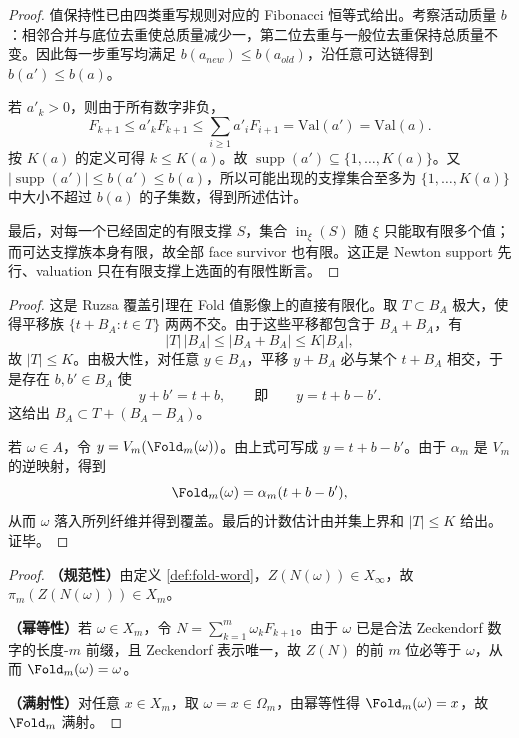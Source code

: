 \begin{proof}
值保持性已由四类重写规则对应的 Fibonacci 恒等式给出。考察活动质量 \(b\)：相邻合并与底位去重使总质量减少一，第二位去重与一般位去重保持总质量不变。因此每一步重写均满足 \(b(a_{new})\le b(a_{old})\)，沿任意可达链得到 \(b(a')\le b(a)\)。

若 \(a'_k>0\)，则由于所有数字非负，
\[
F_{k+1}\le a'_kF_{k+1}\le \sum_{i\ge1}a'_iF_{i+1}=\mathrm{Val}(a')=\mathrm{Val}(a).
\]
按 \(K(a)\) 的定义可得 \(k\le K(a)\)。故 \(\operatorname{supp}(a')\subseteq\{1,\ldots,K(a)\}\)。又 \(|\operatorname{supp}(a')|\le b(a')\le b(a)\)，所以可能出现的支撑集合至多为 \(\{1,\ldots,K(a)\}\) 中大小不超过 \(b(a)\) 的子集数，得到所述估计。

最后，对每一个已经固定的有限支撑 \(S\)，集合 \(\operatorname{in}_\xi(S)\) 随 \(\xi\) 只能取有限多个值；而可达支撑族本身有限，故全部 face survivor 也有限。这正是 Newton support 先行、valuation 只在有限支撑上选面的有限性断言。
\end{proof}

\begin{proof}
这是 Ruzsa 覆盖引理在 Fold 值影像上的直接有限化。取 \(T\subset B_A\) 极大，使得平移族 \(\{t+B_A:t\in T\}\) 两两不交。由于这些平移都包含于 \(B_A+B_A\)，有
\[
|T|\,|B_A|\leq |B_A+B_A|\leq K|B_A|,
\]
故 \(|T|\leq K\)。由极大性，对任意 \(y\in B_A\)，平移 \(y+B_A\) 必与某个 \(t+B_A\) 相交，于是存在 \(b,b'\in B_A\) 使
\[
y+b'=t+b,
\qquad\text{即}\qquad y=t+b-b'.
\]
这给出 \(B_A\subset T+(B_A-B_A)\)。

若 \(\omega\in A\)，令 \(y=V_m(\Fold_m(\omega))\)。由上式可写成 \(y=t+b-b'\)。由于 \(\alpha_m\) 是 \(V_m\) 的逆映射，得到
\[
\Fold_m(\omega)=\alpha_m(t+b-b'),
\]
从而 \(\omega\) 落入所列纤维并得到覆盖。最后的计数估计由并集上界和 \(|T|\leq K\) 给出。证毕。
\end{proof}

\begin{proof}
\textbf{（规范性）}由定义 \ref{def:fold-word}，$Z(N(\omega))\in X_\infty$，故 $\pi_m(Z(N(\omega)))\in X_m$。

\textbf{（幂等性）}若 $\omega\in X_m$，令 $N=\sum_{k=1}^m \omega_k F_{k+1}$。由于 $\omega$ 已是合法 Zeckendorf 数字的长度-$m$ 前缀，且 Zeckendorf 表示唯一，故 $Z(N)$ 的前 $m$ 位必等于 $\omega$，从而 $\Fold_m(\omega)=\omega$。

\textbf{（满射性）}对任意 $x\in X_m$，取 $\omega=x\in\Omega_m$，由幂等性得 $\Fold_m(\omega)=x$，故 $\Fold_m$ 满射。
\end{proof}
